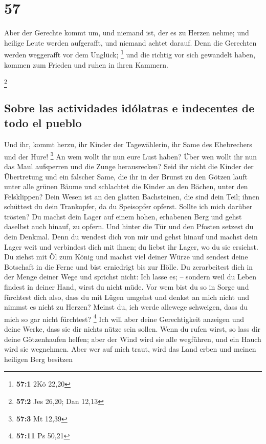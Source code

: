 \hypertarget{section-56}{%
\section{57}\label{section-56}}

 Aber der Gerechte kommt um, und niemand ist, der es zu
Herzen nehme; und heilige Leute werden aufgerafft, und niemand achtet
darauf. Denn die Gerechten werden weggerafft vor dem Unglück;
\footnote{\textbf{57:1} 2Kö 22,20}  und die richtig vor
sich gewandelt haben, kommen zum Frieden und ruhen in ihren Kammern.

\footnote{\textbf{57:2} Jes 26,20; Dan 12,13}

\hypertarget{sobre-las-actividades-iduxf3latras-e-indecentes-de-todo-el-pueblo}{%
\subsection{Sobre las actividades idólatras e indecentes de todo el
pueblo}\label{sobre-las-actividades-iduxf3latras-e-indecentes-de-todo-el-pueblo}}

 Und ihr, kommt herzu, ihr Kinder der Tagewählerin, ihr
Same des Ehebrechers und der Hure! \footnote{\textbf{57:3} Mt 12,39}
 An wem wollt ihr nun eure Lust haben? Über wen wollt ihr
nun das Maul aufsperren und die Zunge herausrecken? Seid ihr nicht die
Kinder der Übertretung und ein falscher Same,  die ihr in
der Brunst zu den Götzen lauft unter alle grünen Bäume und schlachtet
die Kinder an den Bächen, unter den Felsklippen?  Dein
Wesen ist an den glatten Bachsteinen, die sind dein Teil; ihnen
schüttest du dein Trankopfer, da du Speisopfer opferst. Sollte ich mich
darüber trösten?  Du machst dein Lager auf einem hohen,
erhabenen Berg und gehst daselbst auch hinauf, zu opfern. 
Und hinter die Tür und den Pfosten setzest du dein Denkmal. Denn du
wendest dich von mir und gehst hinauf und machst dein Lager weit und
verbindest dich mit ihnen; du liebst ihr Lager, wo du sie ersiehst.
 Du ziehst mit Öl zum König und machst viel deiner Würze
und sendest deine Botschaft in die Ferne und bist erniedrigt bis zur
Hölle.  Du zerarbeitest dich in der Menge deiner Wege und
sprichst nicht: Ich lasse es; -- sondern weil du Leben findest in deiner
Hand, wirst du nicht müde.  Vor wem bist du so in Sorge
und fürchtest dich also, dass du mit Lügen umgehst und denkst an mich
nicht und nimmst es nicht zu Herzen? Meinst du, ich werde allewege
schweigen, dass du mich so gar nicht fürchtest? \footnote{\textbf{57:11}
  Ps 50,21}  Ich will aber deine Gerechtigkeit anzeigen
und deine Werke, dass sie dir nichts nütze sein sollen. 
Wenn du rufen wirst, so lass dir deine Götzenhaufen helfen; aber der
Wind wird sie alle wegführen, und ein Hauch wird sie wegnehmen. Aber wer
auf mich traut, wird das Land erben und meinen heiligen Berg besitzen

